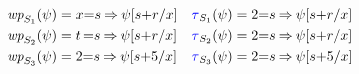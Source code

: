 \begin{scope}
  \small
  \begin{align*}
    \fwp{\aCmd_1}{\bForm} &= x{=}s\limplies\bForm[s{+}r/x] 
    &
    \trd{\aCmd_1}{\bForm} &= 2{=}s\limplies\bForm[s{+}r/x] 
    \\
    \fwp{\aCmd_2}{\bForm} &= t\,{=}s\limplies\bForm[s{+}r/x] 
    &
    \trd{\aCmd_2}{\bForm} &= 2{=}s\limplies\bForm[s{+}r/x] 
    \\
    \fwp{\aCmd_3}{\bForm} &= 2{=}s\limplies\bForm[s{+}5/x] 
    &
    \trd{\aCmd_3}{\bForm} &= 2{=}s\limplies\bForm[s{+}5/x] 
  \end{align*}
\end{scope}




